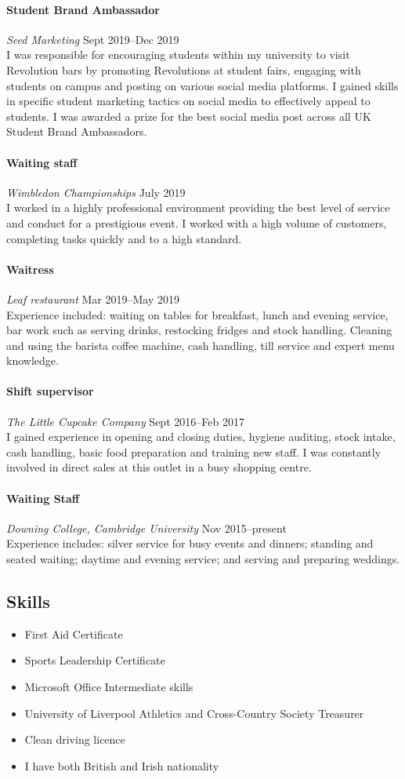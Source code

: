 \documentclass[11pt,a4paper]{article}
\newcommand{\centry}[3]{\paragraph{#1} \textit{#2}%
\hfill#3\\[2pt]}
\begin{document}
\centry{Student Brand Ambassador}{Seed Marketing}{Sept 2019--Dec 2019}

I was responsible for encouraging students within my university to visit
Revolution bars by promoting Revolutions at student fairs, engaging with
students on campus and posting on various social media platforms.  I gained
skills in specific student marketing tactics on social media to effectively
appeal to students. I was awarded a prize for the best social media post across
all UK Student Brand Ambassadors.

\centry{Waiting staff}{Wimbledon Championships}{July 2019}

I worked in a highly professional environment providing the best level of
service and conduct for a prestigious event. I worked with a high volume of
customers, completing tasks quickly and to a high standard.

\centry{Waitress}{Leaf restaurant}{Mar 2019--May 2019}

Experience included: waiting on tables for breakfast, lunch and evening
service, bar work such as serving drinks, restocking fridges and stock
handling. Cleaning and using the barista coffee machine, cash handling, till
service and expert menu knowledge.

\centry{Shift supervisor}{The Little Cupcake Company}{Sept 2016--Feb 2017}

I gained experience in opening and closing duties, hygiene auditing, stock
intake, cash handling, basic food preparation and training new staff. I was
constantly involved in direct sales at this outlet in a busy shopping centre.

\centry{Waiting Staff}{Downing College, Cambridge University}{Nov
  2015--present}

Experience includes: silver service for busy events and dinners; standing and
seated waiting; daytime and evening service; and serving and preparing
weddings.


\subsection*{Skills}
\begin{itemize}[noitemsep]
  \item First Aid Certificate
  \item Sports Leadership Certificate 
  \item Microsoft Office Intermediate skills
  \item University of Liverpool Athletics and Cross-Country Society Treasurer
  \item Clean driving licence 
  \item I have both British and Irish nationality 
\end{itemize}
\end{document}

